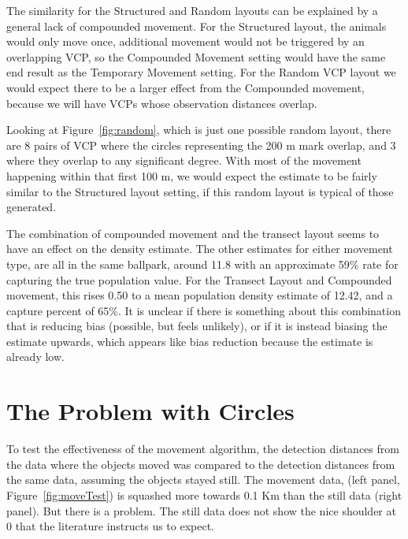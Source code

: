 \documentclass[12pt]{article}
\begin{document}
The similarity for the Structured and Random layouts can be explained by a general lack of compounded movement. For the Structured layout, the animals would only move once, additional movement would not be triggered by an overlapping VCP, so the Compounded Movement setting would have the same end result as the Temporary Movement setting. For the Random VCP layout we would expect there to be a larger effect from the Compounded movement, because we will have VCPs whose observation distances overlap. 

Looking at Figure~\ref{fig:random}, which is just one possible random layout, there are 8 pairs of VCP where the circles representing the 200 m mark overlap, and 3 where they overlap to any significant degree. With most of the movement happening within that first 100 m, we would expect the estimate to be fairly similar to the Structured layout setting, if this random layout is typical of those generated. 

The combination of compounded movement and the transect layout seems to have an effect on the density estimate. The other estimates for either movement type, are all in the same ballpark, around 11.8 with an approximate 59\% rate for capturing the true population value. For the Transect Layout and Compounded movement, this rises 0.50 to a mean population density estimate of 12.42, and a capture percent of 65\%. It is unclear if there is something about this combination that is reducing bias (possible, but feels unlikely), or if it is instead biasing the estimate upwards, which appears like bias reduction because the estimate is already low.



\section{The Problem with Circles}
To test the effectiveness of the movement algorithm, the detection distances from the data where the objects moved was compared to the detection distances from the same data, assuming the objects stayed still. The movement data, (left panel, Figure~\ref{fig:moveTest}) is squashed more towards 0.1 Km than the still data (right panel). But there is a problem. The still data does not show the nice shoulder at 0 that the literature instructs us to expect.
\end{document}
